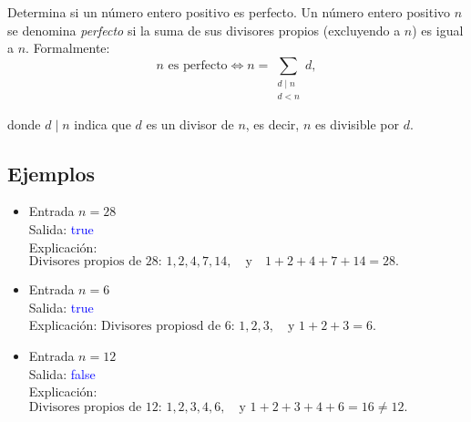 Determina si un número entero positivo es perfecto. Un número entero positivo \( n \) se denomina \textit{perfecto} si la suma de sus divisores propios (excluyendo a \( n \)) es igual a \( n \). Formalmente:
\[
n \text{ es perfecto} \iff n = \sum_{\substack{d \mid n \\ d < n}} d,
\]

donde \( d \mid n \) indica que \( d \) es un divisor de \( n \), es decir, \( n \) es divisible por \( d \). 

\subsection*{Ejemplos}
\begin{itemize}
    \item Entrada \( n = 28 \)\\
    Salida: \textcolor{blue}{true}\\
    Explicación:
    \(
    \text{Divisores propios de 28: } 1, 2, 4, 7, 14, \quad \text{y} \quad 1 + 2 + 4 + 7 + 14 = 28.
    \)
    
    \item Entrada \( n = 6 \)\\
    Salida: \textcolor{blue}{true}\\
    Explicación:
    \(
    \text{Divisores propiosd de 6: } 1, 2, 3, \quad \text{y } 1 + 2 + 3 = 6.
    \)

    \item Entrada \( n = 12 \)\\
    Salida: \textcolor{blue}{false}\\
    Explicación:
    \(
    \text{Divisores propios de 12: } 1, 2, 3, 4, 6, \quad \text{y } 1 + 2 + 3 + 4 + 6 = 16 \neq 12.
    \)
\end{itemize}
